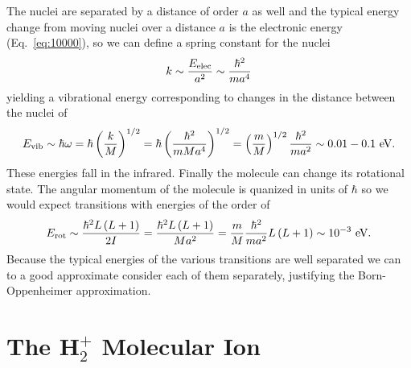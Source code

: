The nuclei are separated by a distance of order $a$ as well and the
typical energy change from moving nuclei over a distance $a$ is the
electronic energy (Eq.~\ref{eq:10000}), so we can define a spring
constant for the nuclei
\begin{equation}
  k \sim \frac{E_\textrm{\scriptsize elec}}{a^2} \sim \frac{\hbar^2}{m a^4}
\label{eq:10001}
\end{equation}
yielding a vibrational energy corresponding to changes in the distance
between the nuclei of 
\begin{equation}
E_\textrm{\scriptsize vib} \sim \hbar \omega = \hbar \left
  (\frac{k}{M} \right )^{1/2}
= \hbar \left ( \frac{\hbar^2}{m M a^4} \right )^{1/2}
= \left ( \frac{m}{M} \right )^{1/2} \frac{\hbar^2}{m a^2}
\sim 0.01-0.1~\textrm{eV}.
\label{eq:10002}
\end{equation}
These energies fall in the infrared.  Finally the molecule can change
its rotational state.  The angular momentum of the molecule is
quanized in units of $\hbar$ so we would expect transitions with
energies of the order of 
\begin{equation}
E_\textrm{\scriptsize rot} \sim \frac{\hbar^2 L \left (L+1\right) }{2
  I} = \frac{\hbar^2 L \left (L+1\right )}{M
  a^2} = \frac{m}{M} \frac{\hbar^2}{m a^2} L \left (L+1\right )\sim 10^{-3}~\textrm{eV}.
\label{eq:10003}
\end{equation}
Because the typical energies of the various transitions are well
separated we can to a good approximate consider each of them
separately, justifying the Born-Oppenheimer approximation.

\section{The H$_2^+$ Molecular Ion}

